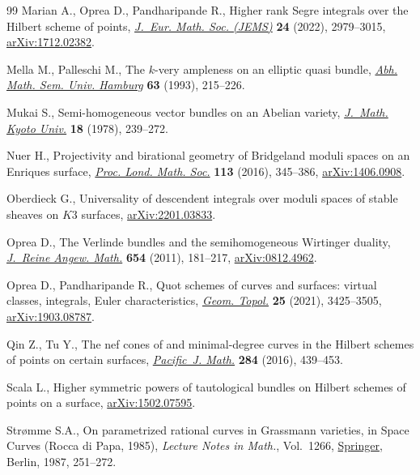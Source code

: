 \begin{thebibliography}{99}
Marian A., Oprea D., Pandharipande R., Higher rank {S}egre integrals over the
 {H}ilbert scheme of points, \href{https://doi.org/10.4171/jems/1149}{\textit{J.~Eur. Math. Soc. (JEMS)}} \textbf{24}
 (2022), 2979--3015, \href{https://arxiv.org/abs/1712.02382}{arXiv:1712.02382}.

Mella M., Palleschi M., The {$k$}-very ampleness on an elliptic quasi bundle,
 \href{https://doi.org/10.1007/BF02941343}{\textit{Abh. Math. Sem. Univ. Hamburg}} \textbf{63} (1993), 215--226.

Mukai S., Semi-homogeneous vector bundles on an {A}belian variety,
 \href{https://doi.org/10.1215/kjm/1250522574}{\textit{J.~Math. Kyoto Univ.}} \textbf{18} (1978), 239--272.

Nuer H., Projectivity and birational geometry of {B}ridgeland moduli spaces on
 an {E}nriques surface, \href{https://doi.org/10.1112/plms/pdw033}{\textit{Proc. Lond. Math. Soc.}} \textbf{113} (2016),
 345--386, \href{https://arxiv.org/abs/1406.0908}{arXiv:1406.0908}.

Oberdieck G., Universality of descendent integrals over moduli spaces of stable
 sheaves on $K3$ surfaces, \href{https://arxiv.org/abs/2201.03833}{arXiv:2201.03833}.

Oprea D., The {V}erlinde bundles and the semihomogeneous {W}irtinger duality,
 \href{https://doi.org/10.1515/CRELLE.2011.032}{\textit{J.~Reine Angew. Math.}} \textbf{654} (2011), 181--217,
 \href{https://arxiv.org/abs/0812.4962}{arXiv:0812.4962}.

Oprea D., Pandharipande R., Quot schemes of curves and surfaces: virtual
 classes, integrals, {E}uler characteristics, \href{https://doi.org/10.2140/gt.2021.25.3425}{\textit{Geom. Topol.}}
 \textbf{25} (2021), 3425--3505, \href{https://arxiv.org/abs/1903.08787}{arXiv:1903.08787}.

Qin Z., Tu Y., The nef cones of and minimal-degree curves in the {H}ilbert
 schemes of points on certain surfaces, \href{https://doi.org/10.2140/pjm.2016.284.439}{\textit{Pacific~J. Math.}} \textbf{284}
 (2016), 439--453.

Scala L., Higher symmetric powers of tautological bundles on {H}ilbert schemes
 of points on a surface, \href{https://arxiv.org/abs/1502.07595}{arXiv:1502.07595}.

Str{\o}mme S.A., On parametrized rational curves in {G}rassmann varieties, in
 Space Curves ({R}occa di {P}apa, 1985), \textit{Lecture Notes in Math.}, Vol.~1266, \href{https://doi.org/10.1007/BFb0078187}{Springer}, Berlin, 1987, 251--272.


\end{thebibliography}
